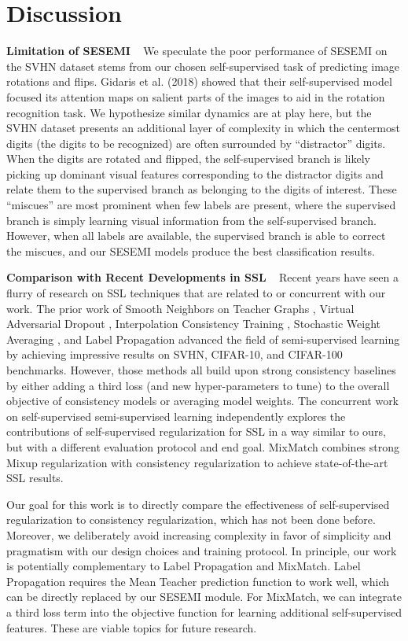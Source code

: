 \documentclass{article}
\begin{document}
\section{Discussion}\label{discuss}
\textbf{Limitation of SESEMI} ~ We speculate the poor performance of SESEMI on the SVHN dataset stems from our chosen self-supervised task of predicting image rotations and flips. Gidaris et al. (2018) \cite{rotations} showed that their self-supervised model focused its attention maps on salient parts of the images to aid in the rotation recognition task. We hypothesize similar dynamics are at play here, but the SVHN dataset presents an additional layer of complexity in which the centermost digits (the digits to be recognized) are often surrounded by ``distractor'' digits. When the digits are rotated and flipped, the self-supervised branch is likely picking up dominant visual features corresponding to the distractor digits and relate them to the supervised branch as belonging to the digits of interest. These ``miscues'' are most prominent when few labels are present, where the supervised branch is simply learning visual information from the self-supervised branch. However, when all labels are available, the supervised branch is able to correct the miscues, and our SESEMI models produce the best classification results.

\textbf{Comparison with Recent Developments in SSL} ~ Recent years have seen a flurry of research on SSL techniques that are related to or concurrent with our work. The prior work of Smooth Neighbors on Teacher Graphs \cite{sntg}, Virtual Adversarial Dropout \cite{vadd}, Interpolation Consistency Training \cite{ict}, Stochastic Weight Averaging \cite{swa}, and Label Propagation \cite{label-prop} advanced the field of semi-supervised learning by achieving impressive results on SVHN, CIFAR-10, and CIFAR-100 benchmarks. However, those methods all build upon strong consistency baselines by either adding a third loss (and new hyper-parameters to tune) to the overall objective of consistency models or averaging model weights. The concurrent work on self-supervised semi-supervised learning \cite{s4l} independently explores the contributions of self-supervised regularization for SSL in a way similar to ours, but with a different evaluation protocol and end goal. MixMatch \cite{mixmatch} combines strong Mixup \cite{mixup} regularization with consistency regularization to achieve state-of-the-art SSL results.

Our goal for this work is to directly compare the effectiveness of self-supervised regularization to consistency regularization, which has not been done before. Moreover, we deliberately avoid increasing complexity in favor of simplicity and pragmatism with our design choices and training protocol. In principle, our work is potentially complementary to Label Propagation and MixMatch. Label Propagation requires the Mean Teacher prediction function to work well, which can be directly replaced by our SESEMI module. For MixMatch, we can integrate a third loss term into the objective function for learning additional self-supervised features. These are viable topics for future research.
\end{document}
